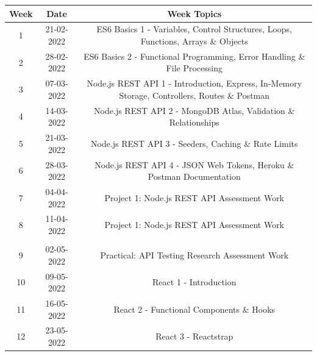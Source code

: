 \documentclass{article}
\begin{document}
\renewcommand{\arraystretch}{1.5}
\begin{tabular}{|c|c|c|c|}
	\hline
	\textbf{Week} & \textbf{Date}     & \multicolumn{2}{c|}{\textbf{Week Topics}}        \\ \hline
	\footnotesize 1      & \footnotesize 21-02-2022 & \multicolumn{2}{c|}{\footnotesize ES6 Basics 1 - Variables, Control Structures, Loops, Functions, Arrays \& Objects} \\ \hline
	\footnotesize 2      & \footnotesize 28-02-2022 & \multicolumn{2}{c|}{\footnotesize ES6 Basics 2 - Functional Programming, Error Handling \& File Processing} \\ \hline
	\footnotesize 3      & \footnotesize 07-03-2022 & \multicolumn{2}{c|}{\footnotesize Node.js REST API 1 - Introduction, Express, In-Memory Storage, Controllers, Routes \& Postman} \\ \hline
	\footnotesize 4      & \footnotesize 14-03-2022 & \multicolumn{2}{c|}{\footnotesize Node.js REST API 2 - MongoDB Atlas, Validation \& Relationships} \\ \hline
	\footnotesize 5      & \footnotesize 21-03-2022 & \multicolumn{2}{c|}{\footnotesize Node.js REST API 3 - Seeders, Caching \& Rate Limits} \\ \hline
	\footnotesize 6      & \footnotesize 28-03-2022 & \multicolumn{2}{c|}{\footnotesize Node.js REST API 4 - JSON Web Tokens, Heroku \& Postman Documentation} \\ \hline
	\footnotesize 7      & \footnotesize 04-04-2022 & \multicolumn{2}{c|}{\footnotesize Project 1: Node.js REST API Assessment Work} \\ \hline
	\footnotesize 8      & \footnotesize 11-04-2022 & \multicolumn{2}{c|}{\footnotesize Project 1: Node.js REST API Assessment Work} \\ \hline
	\rowcolor{yellow} \multicolumn{4}{|c|}{\footnotesize Mid Term Break}                    \\ \hline
	\footnotesize 9      & \footnotesize 02-05-2022 & \multicolumn{2}{c|}{\footnotesize Practical: API Testing Research Assessment Work} \\ \hline
	\footnotesize 10     & \footnotesize 09-05-2022 & \multicolumn{2}{c|}{\footnotesize React 1 - Introduction} \\ \hline
	\footnotesize 11     & \footnotesize 16-05-2022 & \multicolumn{2}{c|}{\footnotesize React 2 - Functional Components \& Hooks} \\ \hline
	\footnotesize 12     & \footnotesize 23-05-2022 & \multicolumn{2}{c|}{\footnotesize React 3 - Reactstrap}     \\ \hline

\end{tabular}
\end{document}
